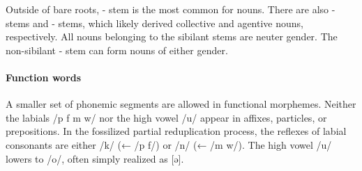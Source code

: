 Outside of bare roots, - stem is the most common for nouns. There are also - stems and - stems, which likely derived collective and agentive nouns, respectively. All nouns belonging to the sibilant stems are neuter gender. The non-sibilant - stem can form nouns of either gender.

\paragraph{Function words}
A smaller set of phonemic segments are allowed in functional morphemes. Neither the labials /p f m w/ nor the high vowel /u/ appear in affixes, particles, or prepositions. In the fossilized partial reduplication process, the reflexes of labial consonants are either /k/ (← /p f/) or /n/ (← /m w/). The high vowel /u/ lowers to /o/, often simply realized as [ə].